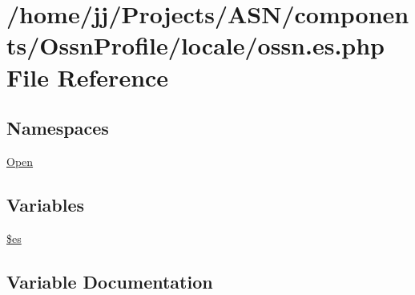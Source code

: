 \hypertarget{components_2_ossn_profile_2locale_2ossn_8es_8php}{}\section{/home/jj/\+Projects/\+A\+S\+N/components/\+Ossn\+Profile/locale/ossn.es.\+php File Reference}
\label{components_2_ossn_profile_2locale_2ossn_8es_8php}
\subsection*{Namespaces}
\begin{DoxyCompactItemize}
\item 
 \hyperlink{namespace_open}{Open}
\end{DoxyCompactItemize}
\subsection*{Variables}
\begin{DoxyCompactItemize}
\item 
\hyperlink{components_2_ossn_profile_2locale_2ossn_8es_8php_a388cbda27103d2baee3997798d1f2744}{\$es}
\end{DoxyCompactItemize}


\subsection{Variable Documentation}
